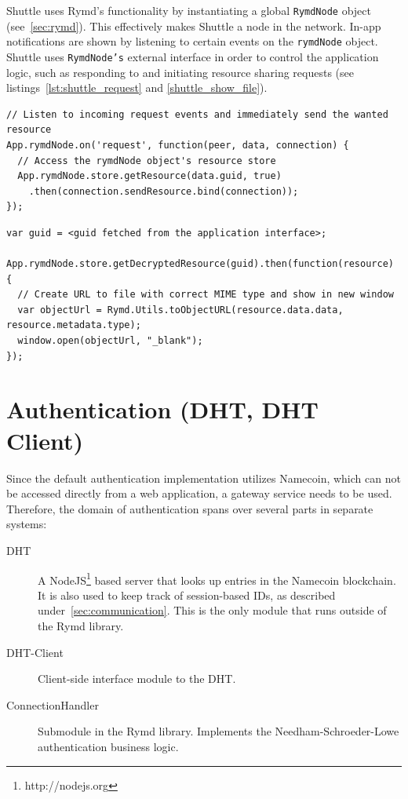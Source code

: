 Shuttle uses Rymd's functionality by instantiating a global \texttt{RymdNode} object (see~\ref{sec:rymd}). This effectively makes Shuttle a node in the network. In-app notifications are shown by listening to certain events on the \texttt{rymdNode} object. Shuttle uses \texttt{RymdNode's} external interface in order to control the application logic, such as responding to and initiating resource sharing requests (see listings~\ref{lst:shuttle_request} and \ref{shuttle_show_file}).

\begin{Code}
\begin{lstlisting}[caption={Incoming download request}, label={lst:shuttle_request}]
// Listen to incoming request events and immediately send the wanted resource
App.rymdNode.on('request', function(peer, data, connection) {
  // Access the rymdNode object's resource store
  App.rymdNode.store.getResource(data.guid, true)
    .then(connection.sendResource.bind(connection));
});
\end{lstlisting}
\end{Code}

\begin{Code}
\begin{lstlisting}[caption={Show a downloaded file}, label={lst:shuttle_show_file}]
var guid = <guid fetched from the application interface>;

App.rymdNode.store.getDecryptedResource(guid).then(function(resource) {
  // Create URL to file with correct MIME type and show in new window
  var objectUrl = Rymd.Utils.toObjectURL(resource.data.data, resource.metadata.type);
  window.open(objectUrl, "_blank");
});
\end{lstlisting}
\end{Code}

\section{Authentication (DHT, DHT Client)}
\label{sec:authentication}
Since the default authentication implementation utilizes Namecoin, which can not be accessed directly from a web application, a gateway service needs to be used. Therefore, the domain of authentication spans over several parts in separate systems:

\begin{description}
  \item[DHT] A NodeJS\footnote{http://nodejs.org} based server that looks up entries in the Namecoin blockchain. It is also used to keep track of session-based IDs, as described under~\ref{sec:communication}. This is the only module that runs outside of the Rymd library.
  \item[DHT-Client] Client-side interface module to the DHT.
  \item[ConnectionHandler] Submodule in the Rymd library. Implements the Needham-Schroeder-Lowe authentication business logic.
\end{description}

